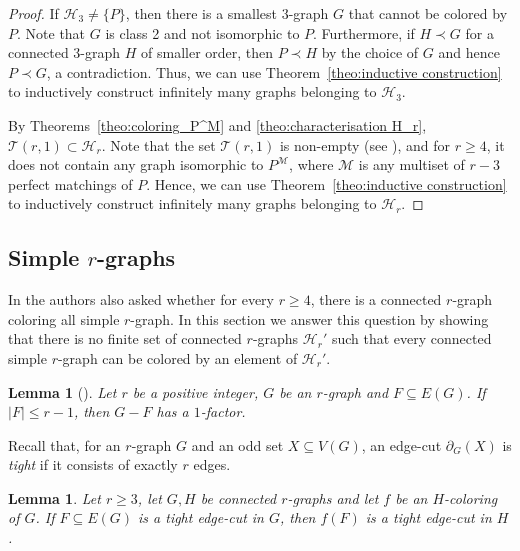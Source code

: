\documentclass[a4paper,11pt]{article}
\newcommand{\ca}{\mathcal}
\newtheorem{lem}[defi]{Lemma}
\theoremstyle{remark}
\begin{document}
\begin{proof}
	If $\ca H_3 \neq \{P\}$, then there is a smallest $3$-graph $G$ that cannot be colored by $P$. Note that $G$ is class 2 and not isomorphic to $P$. Furthermore, if $H \prec G$ for a connected $3$-graph $H$ of smaller order, then $P \prec H$ by the choice of $G$ and hence $P \prec G$, a contradiction. Thus, we can use Theorem~\ref{theo:inductive construction} to inductively construct infinitely many graphs belonging to $\ca H_3$.
	
	By Theorems~\ref{theo:coloring_P^M} and \ref{theo:characterisation H_r}, $ \ca T (r,1) \subset \ca H_r$. Note that the set $\ca T (r,1)$ is non-empty (see \cite{rizzi1999indecomposable}), and for $r\geq 4$, it does not contain any graph isomorphic to $P^{\ca M}$, where $\ca M$ is any multiset of $r-3$ perfect matchings of $P$. Hence, we can use Theorem~\ref{theo:inductive construction} to inductively construct infinitely many graphs belonging to $\ca H_r$.
\end{proof}








\subsection{Simple $r$-graphs}

In \cite{MTZ_r_graphs} the authors also asked whether for every $r\geq 4$, there is a connected $r$-graph coloring all simple $r$-graph. In this section we answer this question by showing that there is no finite set of connected $r$-graphs $\ca H_r'$ such that every connected simple $r$-graph can be colored by an element of $\ca H_r'$. 


\begin{lem}[\cite{jin2017covers}]\label{lem:1-fator_avoiding_r-1_edges}
	Let $r$ be a positive integer, $G$ be an $r$-graph and $F \subseteq E(G)$. 
	If $|F|\le r-1$, then $G-F$ has a $1$-factor.
\end{lem}

Recall that, for an $r$-graph $G$ and an odd set $X\subseteq V(G)$, an edge-cut $\partial_G(X)$ is \emph{tight} if it consists of exactly $r$ edges. 

\begin{lem}\label{Proposition-tightcut-to-tightcut}
	Let $r\geq3$, let $G,H$ be connected $r$-graphs and let $f$ be an $H$-coloring of $G$. If $F\subseteq E(G)$ is a tight edge-cut in $G$, then $f(F)$ is a tight edge-cut in $H$.
\end{lem}
\end{document}
